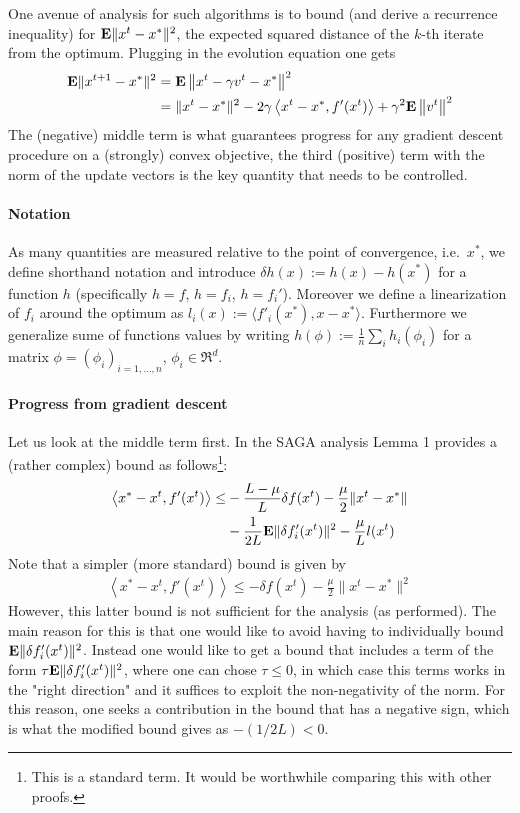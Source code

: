 \documentclass{article}
\newcommand{\E}{{\bf E}}
\begin{document}
One avenue of analysis for such algorithms is to bound (and derive a recurrence inequality) for $\E \| x^t - x^*\|^2$, the expected squared distance of the $k$-th iterate from the optimum. Plugging in the evolution equation one gets 
\begin{align}
\E \|x^{t+1}-x^*\|^2 & = \E \left\| x^t - \gamma v^t - x^* \right\|^2 
\\ & = 
\| x^t -x^*\|^2  - 2 \gamma \left\langle  x^t - x^*,  f'(x^t)  \right\rangle 
+ \gamma^2 \E \left\| v^t \right\|^2
   \nonumber
\end{align}
The (negative) middle term is what guarantees progress for any gradient descent procedure on a (strongly) convex objective, the third (positive) term with the norm of the update vectors is the key quantity that needs to be controlled.  

\paragraph{Notation} As many quantities are measured relative to the point of convergence, i.e.~$x^*$, we define shorthand notation and introduce $\delta h(x) := h(x) - h(x^*)$ for a function $h$ (specifically $h=f$, $h=f_i$, $h=f_i'$). Moreover we define a linearization of $f_i$ around the optimum as $l_i(x) :=  \langle f'_i(x^*), x -x^* \rangle$. Furthermore we generalize sume of functions values by writing $h(\phi) := \frac 1n \sum_i h_i(\phi_i)$ for a matrix $\phi=(\phi_i)_{i=1,\dots,n}$, $\phi_i \in \Re^d$. 
 
\paragraph{Progress from gradient descent} Let us look at the middle term first. In the SAGA analysis Lemma 1 provides a (rather complex) bound as follows\footnote{This is a standard term. It would be worthwhile comparing this with other proofs.}: 
\begin{align}
\label{eq:complex-convex}
\left\langle  x^*- x^t,  f'(x^t)  \right\rangle  \leq 
& - \frac{L-\mu}{L} \delta f(x^t) - \frac \mu 2 \| x^t - x^*\| 
\\ \nonumber & 
-\frac{1}{2L} \E \| \delta f_i'(x^t)\|^2 - \frac{\mu}{L} l(x^t) 
\end{align}
Note that a simpler (more standard) bound is given by
\begin{align}
\label{eq:simple-strong}
\left\langle  x^*- x^t,  f'(x^t)  \right\rangle  \leq - \delta f(x^t) - \frac \mu 2 \| x^t - x^* \|^2
\end{align}
However, this latter bound is not sufficient for the analysis (as performed). The main reason for this is that one would like to avoid having to individually bound $ \E \| \delta f_i'(x^t)\|^2$. Instead one would like to get a bound that includes a term of the form $\tau \E \| \delta f_i'(x^t)\|^2$, where one can chose $\tau \leq 0$, in which case this terms works in the "right direction" and it suffices to exploit the non-negativity of the norm. For this reason, one seeks a contribution in the bound that has a negative sign, which is what the modified bound gives as $-(1/2L)<0$.   
\end{document}
